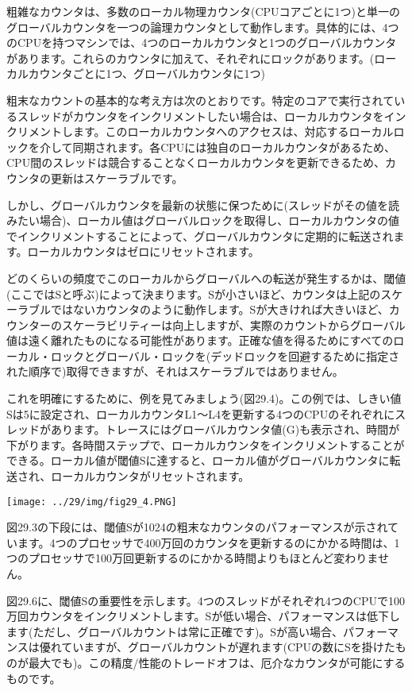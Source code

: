 粗雑なカウンタは、多数のローカル物理カウンタ(CPUコアごとに1つ)と単一のグローバルカウンタを一つの論理カウンタとして動作します。具体的には、4つのCPUを持つマシンでは、4つのローカルカウンタと1つのグローバルカウンタがあります。これらのカウンタに加えて、それぞれにロックがあります。(ローカルカウンタごとに1つ、グローバルカウンタに1つ)

粗末なカウントの基本的な考え方は次のとおりです。特定のコアで実行されているスレッドがカウンタをインクリメントしたい場合は、ローカルカウンタをインクリメントします。このローカルカウンタへのアクセスは、対応するローカルロックを介して同期されます。各CPUには独自のローカルカウンタがあるため、CPU間のスレッドは競合することなくローカルカウンタを更新できるため、カウンタの更新はスケーラブルです。

しかし、グローバルカウンタを最新の状態に保つために(スレッドがその値を読みたい場合)、ローカル値はグローバルロックを取得し、ローカルカウンタの値でインクリメントすることによって、グローバルカウンタに定期的に転送されます。ローカルカウンタはゼロにリセットされます。

どのくらいの頻度でこのローカルからグローバルへの転送が発生するかは、閾値(ここではSと呼ぶ)によって決まります。Sが小さいほど、カウンタは上記のスケーラブルではないカウンタのように動作します。Sが大きければ大きいほど、カウンターのスケーラビリティーは向上しますが、実際のカウントからグローバル値は遠く離れたものになる可能性があります。正確な値を得るためにすべてのローカル・ロックとグローバル・ロックを(デッドロックを回避するために指定された順序で)取得できますが、それはスケーラブルではありません。

これを明確にするために、例を見てみましょう(図29.4)。この例では、しきい値Sは5に設定され、ローカルカウンタL1〜L4を更新する4つのCPUのそれぞれにスレッドがあります。トレースにはグローバルカウンタ値(G)も表示され、時間が下がります。各時間ステップで、ローカルカウンタをインクリメントすることができる。ローカル値が閾値Sに達すると、ローカル値がグローバルカウンタに転送され、ローカルカウンタがリセットされます。

\texttt{[image: ../29/img/fig29\_4.PNG]}

図29.3の下段には、閾値Sが1024の粗末なカウンタのパフォーマンスが示されています。4つのプロセッサで400万回のカウンタを更新するのにかかる時間は、1つのプロセッサで100万回更新するのにかかる時間よりもほとんど変わりません。

図29.6に、閾値Sの重要性を示します。4つのスレッドがそれぞれ4つのCPUで100万回カウンタをインクリメントします。Sが低い場合、パフォーマンスは低下します(ただし、グローバルカウントは常に正確です)。Sが高い場合、パフォーマンスは優れていますが、グローバルカウントが遅れます(CPUの数にSを掛けたものが最大でも)。この精度/性能のトレードオフは、厄介なカウンタが可能にするものです。

